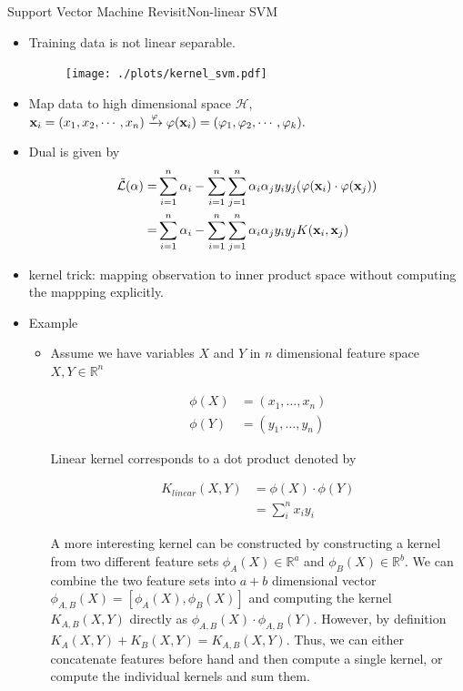 \documentclass[first=dgreen,second=purple,logo=yellowexc]{aaltoslides}
\newcommand{\Lcal}{\mathcal{L}}
\newcommand{\xb}{{\bf x}}
\begin{document}
\begin{frame}[allowframebreaks]{Support Vector Machine Revisit}{Non-linear SVM}
\begin{itemize}
    \item Training data is not linear separable.
    \begin{figure}
        \texttt{[image: ./plots/kernel\_svm.pdf]}
    \end{figure}
    \item Map data to high dimensional space $\mathcal{H}$, $\xb_i = (x_1,x_2,\cdots,x_n) \xrightarrow{\varphi} \varphi(\xb_i) = (\varphi_1,\varphi_2,\cdots,\varphi_k) \text{.}$
    \item Dual is given by
\begin{align*}
\tilde{\Lcal}(\alpha) = &\sum_{i=1}^{n}{\alpha_i} - \sum_{i = 1}^{n}\sum_{j = 1}^{n}{\alpha_i \alpha_j y_i y_j (\varphi(\xb_i) \cdot \varphi(\xb_j))}\\
= &\sum_{i=1}^{n}{\alpha_i} - \sum_{i = 1}^{n}\sum_{j = 1}^{n}{\alpha_i \alpha_j y_i y_j K(\xb_i,\xb_j)}
\end{align*}
    \item kernel trick: mapping observation to inner product space without computing the mappping explicitly.
    \item Example
\begin{itemize}
\item Assume we have variables $X$ and $Y$ in $n$ dimensional feature space $X,Y \in \mathbb{R}^n$

\begin{align}
\phi(X) &= (x_1, \ldots,x_n) \\
\phi(Y) &= (y_1, \ldots, y_n) 
\end{align}

Linear kernel corresponds to a dot product denoted by

\begin{align}
K_{linear}(X,Y) &=  \phi(X) \cdot \phi(Y) \\
 &= \sum_i^n x_i y_i
\end{align}

A more interesting kernel can be constructed by constructing a kernel from two different feature sets $\phi_A(X) \in \mathbb{R}^a$ and $\phi_B(X) \in \mathbb{R}^b$. We can combine the two feature sets into $a+b$ dimensional vector $\phi_{A,B}(X) = [\phi_A(X), \phi_B(X)]$ and computing the kernel $K_{A,B}(X,Y)$ directly as $\phi_{A,B}(X)\cdot \phi_{A,B}(Y)$. However, by definition $K_A(X,Y) + K_B(X,Y) = K_{A,B}(X,Y)$. Thus, we can either concatenate features before hand and then compute a single kernel, or compute the individual kernels and sum them.


\end{itemize}
\end{itemize}
\end{frame}
\end{document}
